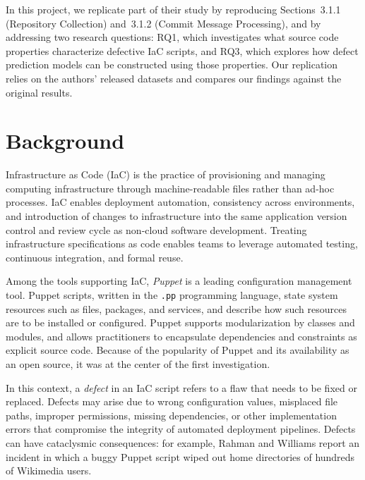 \documentclass[conference]{IEEEtran}
\begin{document}
	In this project, we replicate part of their study by reproducing Sections~3.1.1 
	(Repository Collection) and~3.1.2 (Commit Message Processing), 
	and by addressing two research questions: RQ1, which investigates 
	what source code properties characterize defective IaC scripts, 
	and RQ3, which explores how defect prediction models can be constructed 
	using those properties. Our replication relies on the authors’ released datasets 
	and compares our findings against the original results.
	
	\section{Background}
Infrastructure as Code (IaC) is the practice of provisioning and managing computing infrastructure through machine-readable files rather than ad-hoc processes. IaC enables deployment automation, consistency across environments, and introduction of changes to infrastructure into the same application version control and review cycle as non-cloud software development. Treating infrastructure specifications as code enables teams to leverage automated testing, continuous integration, and formal reuse.

Among the tools supporting IaC, \textit{Puppet} is a leading configuration management tool.
Puppet scripts, written in the \texttt{.pp} programming language, state system resources such as files, packages, and services, and describe how such resources are to be installed or configured. Puppet supports modularization by classes and modules, and allows practitioners to encapsulate dependencies and constraints as explicit source code. Because of the popularity of Puppet and its availability as an open source, it was at the center of the first investigation.

In this context, a \textit{defect} in an IaC script refers to a flaw that needs to be fixed or replaced. Defects may arise due to wrong configuration values, misplaced file paths, improper permissions, missing dependencies, or other implementation errors that compromise the integrity of automated deployment pipelines. Defects can have cataclysmic consequences: for example, Rahman and Williams report an incident in which a buggy Puppet script wiped out home directories of hundreds of Wikimedia users.
\end{document}
